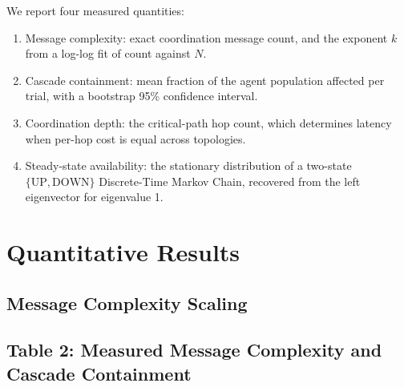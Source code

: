 \documentclass{article}
\begin{document}
We report four measured quantities:
\begin{enumerate}
  \item Message complexity: exact coordination message count, and the exponent $k$ from a log-log fit of count against $N$.
  \item Cascade containment: mean fraction of the agent population affected per trial, with a bootstrap 95\% confidence interval.
  \item Coordination depth: the critical-path hop count, which determines latency when per-hop cost is equal across topologies.
  \item Steady-state availability: the stationary distribution of a two-state $\{\text{UP}, \text{DOWN}\}$ Discrete-Time Markov Chain, recovered from the left eigenvector for eigenvalue 1.
\end{enumerate}




\section{Quantitative Results}



\subsection{Message Complexity Scaling}



\subsection{Table 2: Measured Message Complexity and Cascade Containment}
\begin{table}[htbp]
\centering
{}
\end{table}
\end{document}
